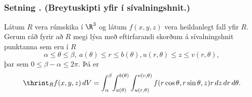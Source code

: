 \subsection{} 

\subsubsection{Setning \kaflanr. (Breytuskipti yfir í sívalningshnit.)}

Látum $R$ vera rúmskika í $\R^3$ og látum $f(x,y,z)$ vera heildanlegt fall yfir $R$.  Gerum ráð fyrir að $R$ megi lýsa með eftirfarandi skorðum á sívalningshnit punktanna sem eru í $R$
$$\alpha\leq \theta\leq \beta,\ a(\theta)\leq r\leq  b(\theta), u(r,\theta)\leq z\leq v(r,\theta),$$ 
þar sem $0\leq \beta-\alpha\leq 2\pi$.  Þá er
$$\thrint_R f(x,y,z)\,dV= 
\int_\alpha^\beta
\!\int_{a(\theta)}^{b(\theta)}\int_{u(r,\theta)}^{v(r,\theta)}      
f(r\cos\theta,r\sin\theta,z)r\,dz\,dr\,d\theta.$$
 




